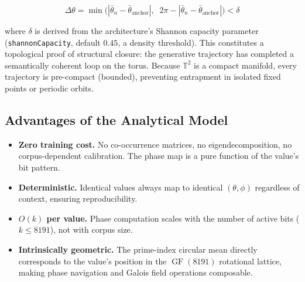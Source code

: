 \begin{equation}
  \Delta\theta = \min\bigl(|\bar{\theta}_n - \bar{\theta}_{\text{anchor}}|,\;\;
                           2\pi - |\bar{\theta}_n - \bar{\theta}_{\text{anchor}}|\bigr)
  < \delta
  \label{eq:closure}
\end{equation}

where $\delta$ is derived from the architecture's Shannon capacity parameter
(\texttt{shannonCapacity}, default $0.45$, a density threshold).  This constitutes a
topological proof of structural closure: the generative trajectory has
completed a semantically coherent loop on the torus.  Because $\mathbb{T}^2$
is a compact manifold, every trajectory is pre-compact (bounded), preventing
entrapment in isolated fixed points or periodic orbits.

\subsection{Advantages of the Analytical Model}

\begin{itemize}[nosep]
  \item \textbf{Zero training cost.}  No co-occurrence matrices, no
        eigendecomposition, no corpus-dependent calibration.  The phase map
        is a pure function of the value's bit pattern.
  \item \textbf{Deterministic.}  Identical values always map to identical
        $(\theta, \phi)$ regardless of context, ensuring reproducibility.
  \item \textbf{$O(k)$ per value.}  Phase computation scales with the number
        of active bits ($k \leq 8191$), not with corpus size.
  \item \textbf{Intrinsically geometric.}  The prime-index circular mean
        directly corresponds to the value's position in the
        $\operatorname{GF}(8191)$ rotational lattice, making phase navigation
        and Galois field operations composable.
\end{itemize}
